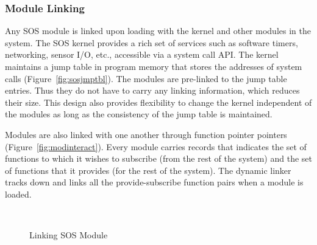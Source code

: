 \subsubsection{Module Linking}
\label{sec:soslinking}
%
Any SOS module is linked upon loading with the kernel and other
modules in the system. 
%
%
The SOS kernel provides a rich set of services such as software
timers, networking, sensor I/O, etc., accessible via a system
call API.
%
The kernel maintains a jump table in program memory that stores the
addresses of system calls (Figure~\ref{fig:sosjmptbl}).
%
The modules are pre-linked to the jump table entries.
%
Thus they do not have to carry any linking information, which reduces
their size.
%
This design also provides flexibility to change the kernel independent
of the modules as long as the consistency of the jump table is maintained.
%

Modules are also linked with one another through function pointer
pointers (Figure~\ref{fig:modinteract}).
%
Every module carries records that indicates the set of functions to
which it wishes to subscribe (from the rest of the system) and the set
of functions that it provides (for the rest of the system).
%
The dynamic linker tracks down and links all the provide-subscribe
function pairs when a module is loaded.
%
\begin{figure}[htpb]
 \centering
  \mbox{
    \hspace{0.2in}
  }
  \caption{Linking SOS Module}
\end{figure}   
%
